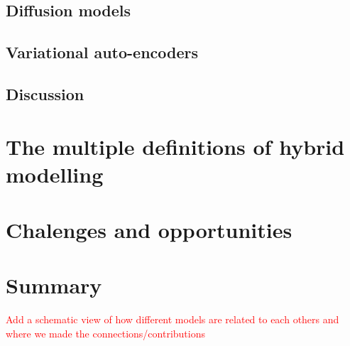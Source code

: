 \subsection{Diffusion models}
\subsection{Variational auto-encoders}
\subsection{Discussion}

\section{The multiple definitions of hybrid modelling}

\section{Chalenges and opportunities}

\section{Summary}

\textcolor{red}{Add a schematic view of how different models are related to each others and where we made the connections/contributions}
